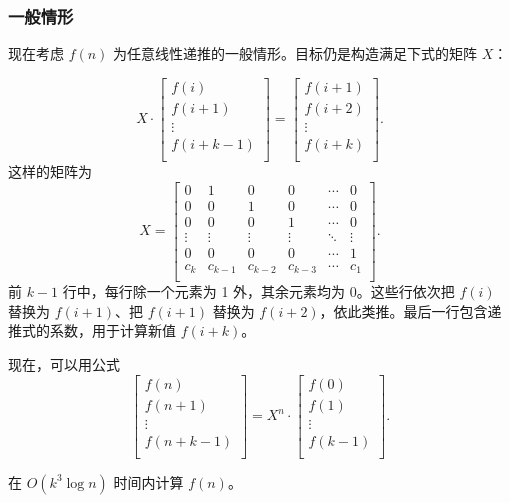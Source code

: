 \subsubsection{一般情形}

现在考虑 $f(n)$ 为任意线性递推的一般情形。目标仍是构造满足下式的矩阵 $X$：

\[ X \cdot
 \begin{bmatrix}
  f(i) \\
  f(i+1) \\
  \vdots \\
  f(i+k-1) \\
 \end{bmatrix}
=
 \begin{bmatrix}
  f(i+1) \\
  f(i+2) \\
  \vdots \\
  f(i+k) \\
 \end{bmatrix}.
\]
这样的矩阵为
\[
X =
 \begin{bmatrix}
  0 & 1 & 0 & 0 & \cdots & 0 \\
  0 & 0 & 1 & 0 & \cdots & 0 \\
  0 & 0 & 0 & 1 & \cdots & 0 \\
  \vdots & \vdots & \vdots & \vdots & \ddots & \vdots \\
  0 & 0 & 0 & 0 & \cdots & 1 \\
  c_k & c_{k-1} & c_{k-2} & c_{k-3} & \cdots & c_1 \\
 \end{bmatrix}.
\]
前 $k-1$ 行中，每行除一个元素为 1 外，其余元素均为 0。这些行依次把 $f(i)$ 替换为 $f(i+1)$、把 $f(i+1)$ 替换为 $f(i+2)$，依此类推。最后一行包含递推式的系数，用于计算新值 $f(i+k)$。

\begin{samepage}
现在，可以用公式
\[
 \begin{bmatrix}
  f(n) \\
  f(n+1) \\
  \vdots \\
  f(n+k-1) \\
 \end{bmatrix}
=
X^n \cdot
 \begin{bmatrix}
  f(0) \\
  f(1) \\
  \vdots \\
  f(k-1) \\
 \end{bmatrix}.
\]
\end{samepage}
在 $O(k^3 \log n)$ 时间内计算 $f(n)$。

